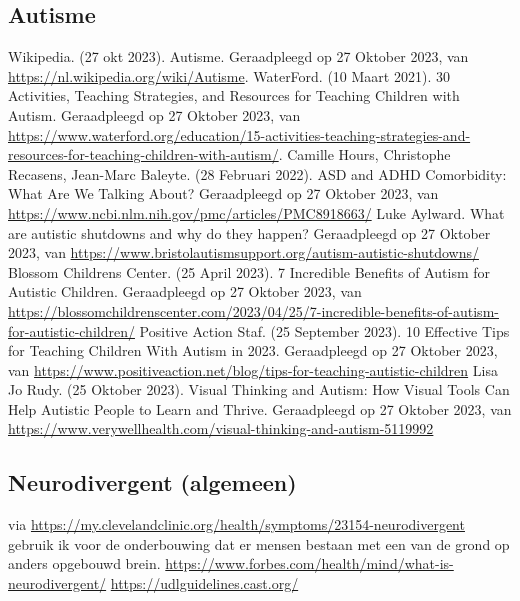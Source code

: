 \documentclass{article}
\begin{document}
\begin{thebibliography}{9}
        \item\subsection*{Autisme}
                Wikipedia. (27 okt 2023). Autisme. Geraadpleegd op 27 Oktober 2023, van \url{https://nl.wikipedia.org/wiki/Autisme}.
                WaterFord. (10 Maart 2021). 30 Activities, Teaching Strategies, and Resources for Teaching Children with Autism. Geraadpleegd op 27 Oktober 2023, van \url{https://www.waterford.org/education/15-activities-teaching-strategies-and-resources-for-teaching-children-with-autism/}.
                Camille Hours, Christophe Recasens, Jean-Marc Baleyte. (28 Februari 2022). ASD and ADHD Comorbidity: What Are We Talking About? Geraadpleegd op 27 Oktober 2023, van \url{https://www.ncbi.nlm.nih.gov/pmc/articles/PMC8918663/}
                Luke Aylward. What are autistic shutdowns and why do they happen? Geraadpleegd op 27 Oktober 2023, van \url{https://www.bristolautismsupport.org/autism-autistic-shutdowns/}
                Blossom Childrens Center. (25 April 2023). 7 Incredible Benefits of Autism for Autistic Children. Geraadpleegd op 27 Oktober 2023, van \url{https://blossomchildrenscenter.com/2023/04/25/7-incredible-benefits-of-autism-for-autistic-children/}
                Positive Action Staf. (25 September 2023). 10 Effective Tips for Teaching Children With Autism in 2023. Geraadpleegd op 27 Oktober 2023, van \url{https://www.positiveaction.net/blog/tips-for-teaching-autistic-children}
                Lisa Jo Rudy. (25 Oktober 2023). Visual Thinking and Autism: How Visual Tools Can Help Autistic People to Learn and Thrive. Geraadpleegd op 27 Oktober 2023, van \url{https://www.verywellhealth.com/visual-thinking-and-autism-5119992}

        \item\subsection*{Neurodivergent (algemeen)}
                via \url{https://my.clevelandclinic.org/health/symptoms/23154-neurodivergent} gebruik ik voor de onderbouwing dat er mensen bestaan met een van de grond op anders opgebouwd brein.
                \url{https://www.forbes.com/health/mind/what-is-neurodivergent/}
                \url{https://udlguidelines.cast.org/}


\end{thebibliography}
\end{document}
